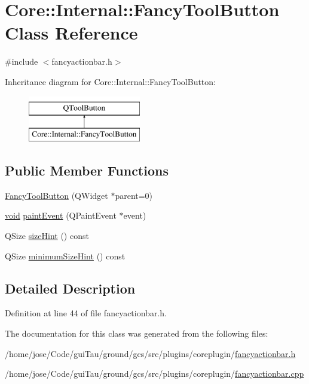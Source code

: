 \hypertarget{class_core_1_1_internal_1_1_fancy_tool_button}{\section{Core\-:\-:Internal\-:\-:Fancy\-Tool\-Button Class Reference}
\label{class_core_1_1_internal_1_1_fancy_tool_button}
}


{\ttfamily \#include $<$fancyactionbar.\-h$>$}

Inheritance diagram for Core\-:\-:Internal\-:\-:Fancy\-Tool\-Button\-:\begin{figure}[H]
\begin{center}
\leavevmode
\includegraphics[height=2.000000cm]{class_core_1_1_internal_1_1_fancy_tool_button}
\end{center}
\end{figure}
\subsection*{Public Member Functions}
\begin{DoxyCompactItemize}
\item 
\hyperlink{group___core_plugin_gaa49bf0d75cd7c6fae6f16affc94534d4}{Fancy\-Tool\-Button} (Q\-Widget $\ast$parent=0)
\item 
\hyperlink{group___u_a_v_objects_plugin_ga444cf2ff3f0ecbe028adce838d373f5c}{void} \hyperlink{group___core_plugin_ga2904020ad431428edd939ec8bac39c59}{paint\-Event} (Q\-Paint\-Event $\ast$event)
\item 
Q\-Size \hyperlink{group___core_plugin_ga2ee61871e7efb65dabbc51706db84ea3}{size\-Hint} () const 
\item 
Q\-Size \hyperlink{group___core_plugin_ga7067d0c58b6084aea70a0e044acb0e91}{minimum\-Size\-Hint} () const 
\end{DoxyCompactItemize}


\subsection{Detailed Description}


Definition at line 44 of file fancyactionbar.\-h.



The documentation for this class was generated from the following files\-:\begin{DoxyCompactItemize}
\item 
/home/jose/\-Code/gui\-Tau/ground/gcs/src/plugins/coreplugin/\hyperlink{fancyactionbar_8h}{fancyactionbar.\-h}\item 
/home/jose/\-Code/gui\-Tau/ground/gcs/src/plugins/coreplugin/\hyperlink{fancyactionbar_8cpp}{fancyactionbar.\-cpp}\end{DoxyCompactItemize}
